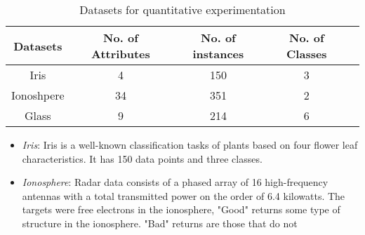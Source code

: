 \documentclass[english]{tktltiki2}
\theoremstyle{definition}
\theoremstyle{remark}
\begin{document}
\begin{table}[H]
	\caption{Datasets for quantitative experimentation}
	\label{tab:quantitative_experimentation_dataset}
	\begin{center}
	\begin{tabular}{|c|c|c|c|c|}
		\hline	
		\textbf{Datasets} & \textbf{No. of Attributes} & \textbf{No. of instances} & \textbf{No. of Classes} \\ \hline
		
		Iris  & 4 & 150 & 3 \\ \hline
		Ionoshpere  & 34 & 351 & 2 \\ \hline
		Glass  & 9 & 214 & 6 \\ \hline
	\end{tabular}
	\end{center}
\end{table}

%			
%			
%			

\begin{center}
	\begin{itemize}
		\item \textit{Iris}: Iris is a well-known classification tasks of plants based on four flower leaf characteristics. It has 150 data points and three classes.
		\item \textit{Ionosphere}: Radar data consists of a phased array of 16 high-frequency antennas with a total transmitted power on the order of 6.4 kilowatts. The targets were free electrons in the ionosphere, "Good" returns some type of structure in the ionosphere. "Bad" returns are those that do not
		
	\end{itemize}
\end{center}
\end{document}
